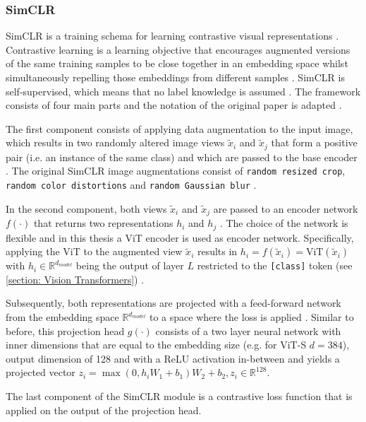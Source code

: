 \subsubsection{SimCLR}
\label{section: SimCLR}
SimCLR is a training schema for learning contrastive visual representations \citep{Chen2020}.
Contrastive learning is a learning objective that encourages augmented versions of the same training samples to be close together in an embedding space whilst simultaneously repelling those embeddings from different samples \citep{Jaiswal2020}.
SimCLR is self-supervised, which means that no label knowledge is assumed \citep{Chen2020}.
The framework consists of four main parts and the notation of the original paper is adapted \citep{Chen2020}.
\par
The first component consists of applying data augmentation to the input image, which results in two randomly altered image views $\tilde{x}_i$ and $\tilde{x}_j$ that form a positive pair (i.e. an instance of the same class) and which are passed to the base encoder \citep{Chen2020}.
The original SimCLR image augmentations consist of \texttt{random resized crop}, \texttt{random color distortions} and \texttt{random Gaussian blur} \citep{Chen2020}.
\par
In the second component, both views $\tilde{x}_i$ and $\tilde{x}_j$ are passed to an encoder network $f(\cdot)$ that returns two representations $h_i$ and $h_j$ \citep{Chen2020}.
The choice of the network is flexible and in this thesis a ViT encoder is used as encoder network.
Specifically, applying the ViT to the augmented view $\tilde{x}_i$ results in $h_i = f(\tilde{x}_i) = \text{ViT}(\tilde{x}_i)$ with $h_i \in \mathbb{R}^{d_{model}}$ being the output of layer $L$ restricted to the \texttt{[class]} token (see \ref{section: Vision Transformers}) \citep{Chen2020}.
\par
Subsequently, both representations are projected with a feed-forward network from the embedding space $\mathbb{R}^{d_{model}}$ to a space where the loss is applied \citep{Chen2020}.
Similar to before, this projection head $g(\cdot)$ consists of a two layer neural network with inner dimensions that are equal to the embedding size (e.g. for ViT-S $d=384$), output dimension of 128 and with a ReLU activation in-between \citep{Chen2020} and yields a projected vector $z_i = \max(0, h_iW_1 + b_1)W_2+b_2, z_i \in \mathbb{R}^{128}$.
\par 
The last component of the SimCLR module is a contrastive loss function that is applied on the output of the projection head.
